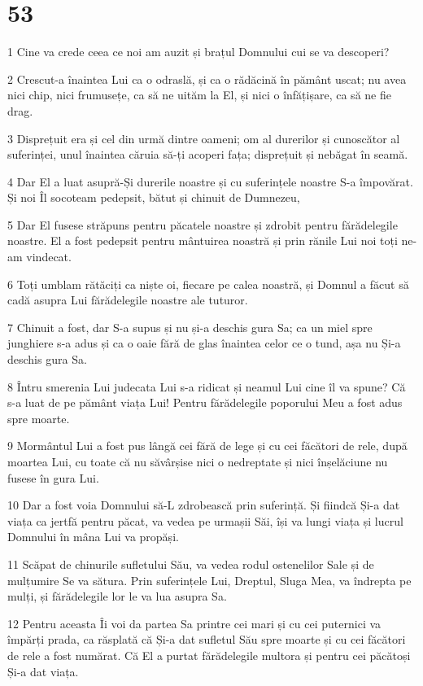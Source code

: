 \chapter{53}

\par 1 Cine va crede ceea ce noi am auzit și brațul Domnului cui se va descoperi?
\par 2 Crescut-a înaintea Lui ca o odraslă, și ca o rădăcină în pământ uscat; nu avea nici chip, nici frumusețe, ca să ne uităm la El, și nici o înfățișare, ca să ne fie drag.
\par 3 Disprețuit era și cel din urmă dintre oameni; om al durerilor și cunoscător al suferinței, unul înaintea căruia să-ți acoperi fața; disprețuit și nebăgat în seamă.
\par 4 Dar El a luat asupră-Și durerile noastre și cu suferințele noastre S-a împovărat. Și noi Îl socoteam pedepsit, bătut și chinuit de Dumnezeu,
\par 5 Dar El fusese străpuns pentru păcatele noastre și zdrobit pentru fărădelegile noastre. El a fost pedepsit pentru mântuirea noastră și prin rănile Lui noi toți ne-am vindecat.
\par 6 Toți umblam rătăciți ca niște oi, fiecare pe calea noastră, și Domnul a făcut să cadă asupra Lui fărădelegile noastre ale tuturor.
\par 7 Chinuit a fost, dar S-a supus și nu și-a deschis gura Sa; ca un miel spre junghiere s-a adus și ca o oaie fără de glas înaintea celor ce o tund, așa nu Și-a deschis gura Sa.
\par 8 Întru smerenia Lui judecata Lui s-a ridicat și neamul Lui cine îl va spune? Că s-a luat de pe pământ viața Lui! Pentru fărădelegile poporului Meu a fost adus spre moarte.
\par 9 Mormântul Lui a fost pus lângă cei fără de lege și cu cei făcători de rele, după moartea Lui, cu toate că nu săvârșise nici o nedreptate și nici înșelăciune nu fusese în gura Lui.
\par 10 Dar a fost voia Domnului să-L zdrobească prin suferință. Și fiindcă Și-a dat viața ca jertfă pentru păcat, va vedea pe urmașii Săi, își va lungi viața și lucrul Domnului în mâna Lui va propăși.
\par 11 Scăpat de chinurile sufletului Său, va vedea rodul ostenelilor Sale și de mulțumire Se va sătura. Prin suferințele Lui, Dreptul, Sluga Mea, va îndrepta pe mulți, și fărădelegile lor le va lua asupra Sa.
\par 12 Pentru aceasta Îi voi da partea Sa printre cei mari și cu cei puternici va împărți prada, ca răsplată că Și-a dat sufletul Său spre moarte și cu cei făcători de rele a fost numărat. Că El a purtat fărădelegile multora și pentru cei păcătoși Și-a dat viața.

